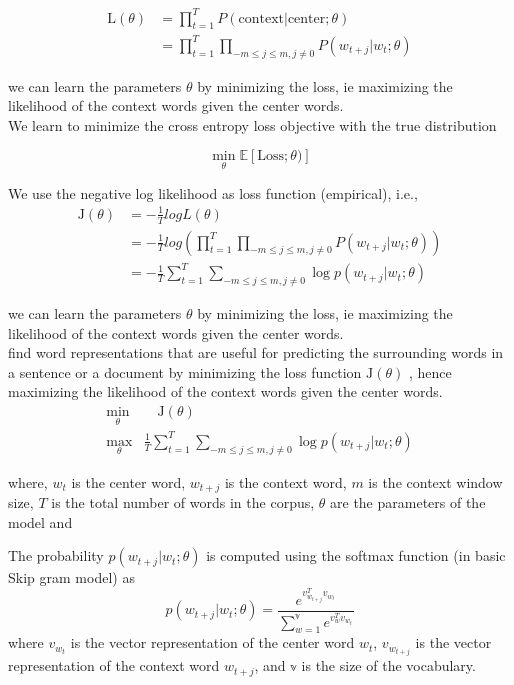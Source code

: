 \begin{align*}
    \textrm{L}(\theta) &= \prod_{t = 1}^{T} P( \text{context} | \text{center}; \theta) \\
    &= \prod_{t = 1}^{T} \prod_{-m \leq j \leq m, j \neq 0} P(w_{t+j} | w_t; \theta)
\end{align*}

we can learn the parameters $\theta$ by minimizing the loss, ie maximizing the likelihood of the context words given the center words.\\

We learn to minimize the cross entropy loss objective with the true distribution 

$$
\min_{\theta} \mathbb{E} \left[  \text{Loss} ; \theta) \right]
$$

We use the negative log likelihood as loss function (empirical), i.e.,
\begin{align*}
    \textrm{J}(\theta) &= - \frac{1}{T} log L(\theta) \\
    &= - \frac{1}{T} log \left(\prod_{t = 1}^{T} \prod_{-m \leq j \leq m, j \neq 0} P(w_{t+j} | w_t; \theta)\right) \\
    &= - \frac{1}{T} \sum_{t=1}^{T} \sum_{-m \leq j \leq m, j \neq 0} \log p(w_{t+j} | w_t; \theta)
\end{align*}

we can learn the parameters $\theta$ by minimizing the loss, ie maximizing the likelihood of the context words given the center words.\\

 find word representations that are useful for predicting the surrounding words in a sentence or a document  by minimizing the loss function $\textrm{J}(\theta)$ , hence maximizing the likelihood of the context words given the center words.
\begin{align*}
    \min_{\theta} & \quad \textrm{J}(\theta) \\
    \max_{\theta} & \frac{1}{T} \sum_{t=1}^{T} \sum_{-m \leq j \leq m, j \neq 0} \log p(w_{t+j} | w_t; \theta)
\end{align*}

\noindent where, 
$w_t$ is the center word, 
$w_{t+j}$ is the context word, 
$m$ is the context window size, 
$T$ is the total number of words in the corpus,
$\theta$ are the parameters of the model and


The probability $p(w_{t+j} | w_t; \theta)$ is computed using the softmax function (in basic Skip gram model) as 
$$ 
    p(w_{t+j} | w_t; \theta) = \frac{e^{v_{w_{t+j}}^T v_{w_t}}}{\sum_{w=1}^{\mathbb{v}} e^{v_{w}^T v_{w_t}}} 
$$
\noindent where 
$v_{w_t}$ is the vector representation of the center word $w_t$, $v_{w_{t+j}}$ is the vector representation of the context word $w_{t+j}$, and $\mathbb{v}$ is the size of the vocabulary.\\

